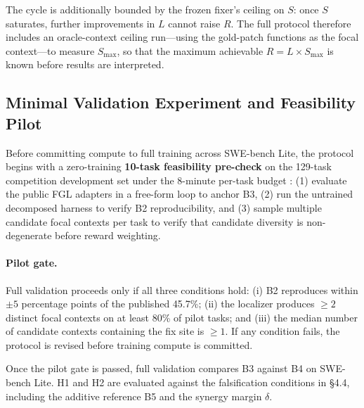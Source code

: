 \documentclass[11pt,a4paper]{article}
\begin{document}
The cycle is additionally bounded by the frozen fixer's ceiling on $S$: once $S$ saturates, further improvements in $L$ cannot raise $R$. The full protocol therefore includes an oracle-context ceiling run---using the gold-patch functions as the focal context---to measure $S_{\max}$, so that the maximum achievable $R = L \times S_{\max}$ is known before results are interpreted.

\subsection{Minimal Validation Experiment and Feasibility Pilot}
Before committing compute to full training across SWE-bench Lite, the protocol begins with a zero-training \textbf{10-task feasibility pre-check} on the 129-task competition development set \cite{KAGGLE} under the 8-minute per-task budget \cite{FGL}: (1) evaluate the public FGL adapters in a free-form loop to anchor B3, (2) run the untrained decomposed harness to verify B2 reproducibility, and (3) sample multiple candidate focal contexts per task to verify that candidate diversity is non-degenerate before reward weighting.

\paragraph{Pilot gate.}
Full validation proceeds only if all three conditions hold: (i) B2 reproduces within $\pm 5$ percentage points of the published 45.7\%; (ii) the localizer produces $\geq 2$ distinct focal contexts on at least 80\% of pilot tasks; and (iii) the median number of candidate contexts containing the fix site is $\geq 1$. If any condition fails, the protocol is revised before training compute is committed.

Once the pilot gate is passed, full validation compares B3 against B4 on SWE-bench Lite. H1 and H2 are evaluated against the falsification conditions in \S4.4, including the additive reference B5 and the synergy margin $\delta$.
\end{document}

